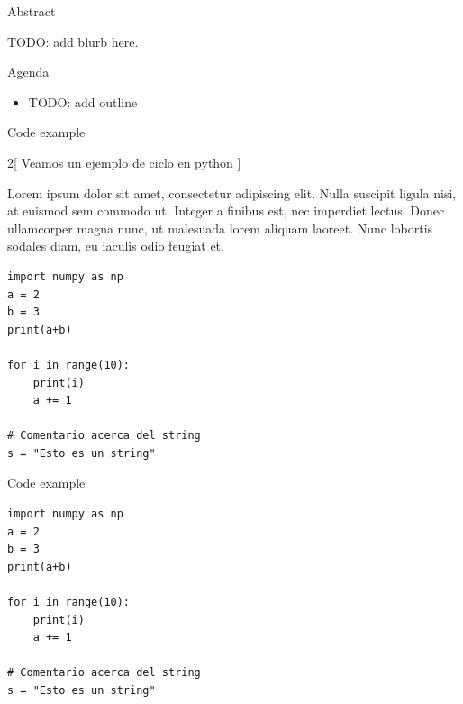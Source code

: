 \documentclass[mathserif]{beamer}
\subtitle{\bfseries%
  {TODO: add lecture subtitle}\\%
  {\tiny\it TODO: add topics}\\%
}
\begin{document}


\begin{frame}{Abstract}

	\begin{blurb}
		TODO: add blurb here.
	\end{blurb}
\end{frame}

\begin{frame}{Agenda}
	\begin{itemize}
		\item TODO: add outline
	\end{itemize}
\end{frame}

\begin{frame}[fragile]{Code example}
\begin{multicols}{2}[
Veamos un ejemplo de ciclo en python
]

Lorem ipsum dolor sit amet, consectetur adipiscing elit. Nulla suscipit ligula nisi, at euismod sem commodo ut. Integer a finibus est, nec imperdiet lectus. Donec ullamcorper magna nunc, ut malesuada lorem aliquam laoreet. Nunc lobortis sodales diam, eu iaculis odio feugiat et. 

\columnbreak

\begin{lstlisting}
import numpy as np
a = 2
b = 3
print(a+b)

for i in range(10):
    print(i)
    a += 1
    
# Comentario acerca del string
s = "Esto es un string"
\end{lstlisting}

\end{multicols}
\end{frame}

\begin{frame}[fragile]{Code example}

\begin{lstlisting}
import numpy as np
a = 2
b = 3
print(a+b)

for i in range(10):
    print(i)
    a += 1
    
# Comentario acerca del string
s = "Esto es un string"
\end{lstlisting}

\end{frame}
\end{document}
